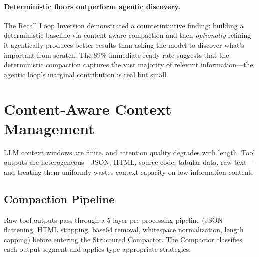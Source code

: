 \documentclass{article}
\begin{document}
\paragraph{Deterministic floors outperform agentic discovery.}
The Recall Loop Inversion demonstrated a counterintuitive finding: building a deterministic baseline via content-aware compaction and then \emph{optionally} refining it agentically produces better results than asking the model to discover what's important from scratch.
The 89\% immediate-ready rate suggests that the deterministic compaction captures the vast majority of relevant information---the agentic loop's marginal contribution is real but small.

\section{Content-Aware Context Management}
\label{sec:context_management}

LLM context windows are finite, and attention quality degrades with length.
Tool outputs are heterogeneous---JSON, HTML, source code, tabular data, raw text---and treating them uniformly wastes context capacity on low-information content.

\subsection{Compaction Pipeline}

Raw tool outputs pass through a 5-layer pre-processing pipeline (JSON flattening, HTML stripping, base64 removal, whitespace normalization, length capping) before entering the Structured Compactor.
The Compactor classifies each output segment and applies type-appropriate strategies:
\end{document}
